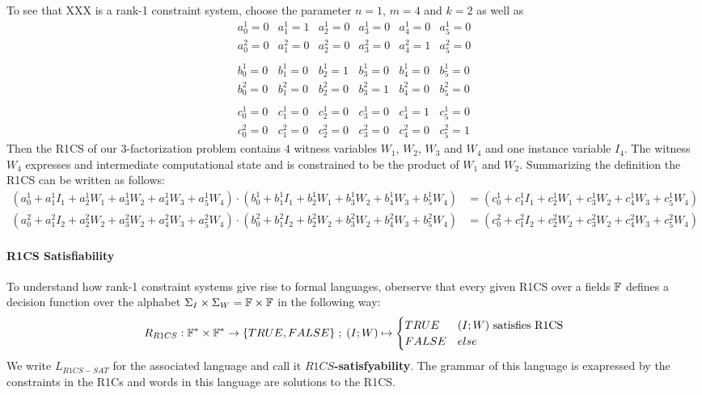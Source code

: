 \begin{example}[3-Factorization]
To see that XXX is a rank-1 constraint system, choose the parameter $n=1$, $m=4$ and $k=2$ as well as
$$
\begin{array}{llllll}
a_0^1 = 0 & a_1^1= 1 & a_2^1= 0 & a_3^1 = 0 & a_4^1= 0  & a_5^1= 0 \\ 
a_0^2 = 0 & a_1^2= 0 & a_2^2= 0 & a_3^2 = 0 & a_4^2= 1  & a_5^2= 0 \\ 
\\
b_0^1 = 0 & b_1^1= 0 & b_2^1= 1 & b_3^1 = 0 & b_4^1= 0  & b_5^1= 0 \\ 
b_0^2 = 0 & b_1^2= 0 & b_2^2= 0 & b_3^2 = 1 & b_4^2= 0  & b_5^2= 0 \\ 
\\
c_0^1 = 0 & c_1^1= 0 & c_2^1= 0 & c_3^1 = 0 & c_4^1= 1  & c_5^1= 0 \\ 
c_0^2 = 0 & c_1^2= 0 & c_2^2= 0 & c_3^2 = 0 & c_4^2= 0  & c_5^2= 1 
\end{array} 
$$
Then the R1CS of our $3$-factorization problem contains $4$ witness variables $W_1$, $W_2$, $W_3$ and $W_4$ and one instance variable $I_4$. The witness $W_4$ expresses and intermediate computational state and is constrained to be the product of $W_1$ and $W_2$. Summarizing the definition the R1CS  can be written as follows:
\begin{align*}
\scriptstyle
\left(a^1_0 + a_1^1 I_1 + a_2^1 W_1 + a_3^1 W_2 + a_4^1 W_3 + a_5^1 W_4\right)\cdot
\left(b^1_0 + b_1^1 I_1 + b_2^1 W_1 + b_3^1 W_2 + b_4^1 W_3 + b_5^1 W_4\right) &=
\scriptstyle
\left(c^1_0 + c_1^1 I_1 + c_2^1 W_1 + c_3^1 W_2 + c_4^1 W_3 + c_5^1 W_4\right)\\
\scriptstyle
\left(a^2_0 + a_1^2 I_2 + a_2^2 W_2 + a_3^2 W_2 + a_4^2 W_3 + a_5^2 W_4\right)\cdot
\left(b^2_0 + b_1^2 I_2 + b_2^2 W_2 + b_3^2 W_2 + b_4^2 W_3 + b_5^2 W_4\right) &=
\scriptstyle
\left(c^2_0 + c_1^2 I_2 + c_2^2 W_2 + c_3^2 W_2 + c_4^2 W_3 + c_5^2 W_4\right)
\end{align*}
\end{example}

\paragraph{R1CS Satisfiability}To understand how rank-1 constraint systems give rise to formal languages, oberserve that every given R1CS over a fields $\mathbb{F}$ defines a decision function over the alphabet $\Sigma_I \times \Sigma_W = \mathbb{F} \times \mathbb{F}$ in the following way:
\begin{equation}
R_{R1CS} : \mathbb{F}^* \times \mathbb{F}^* \to \{TRUE, FALSE\}\;;\;
(I;W) \mapsto
\begin{cases}
TRUE & (I;W) \text{ satisfies R1CS}\\
FALSE & else
\end{cases}
\end{equation}
We write $L_{R1CS-SAT}$ for the associated language and call it \textbf{$R1CS$-satisfyability}. The grammar of this language is exapressed by the constraints in the R1Cs and words in this language are solutions to the R1CS. 

